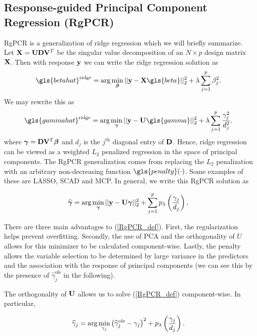 \documentclass[main.tex]{subfiles}
\begin{document}
%
%
%
%
%
%
%
%
%
%
%

\subsection{Response-guided Principal Component Regression (RgPCR)}
RgPCR is a generalization of ridge regression which we will briefly summarize. Let $\mathbf{X} = \mathbf{U} \mathbf{D} \mathbf{V}^T$ be the singular value decomposition of an $N \times p$ design matrix $\mathbf{X}$. Then with response $\mathbf{y}$ we can write the ridge regression solution as
\begin{align}
    \gls{betahat}^{\ridge} = \argmin_{\bbeta} ||\y - \X \gls{beta}||_2^2 + \lambda \sum_{j = 1}^p \beta_j^2.
\end{align}
We may rewrite this as
\begin{align}
    \gls{gammahat}^{\ridge} = \argmin_{\bgamma} ||\y - \U \gls{gamma}||^2_2 + \lambda \sum_{j = 1}^p \frac{\gamma_j^2}{d_j^2}. \label{RgPCR_ridge}
\end{align}
where $\boldsymbol \gamma = \mathbf{D} \mathbf{V}^T \boldsymbol \beta$ and $d_j$ is the $j^{\text{th}}$ diagonal entry of $\mathbf{D}$. Hence, ridge regression can be viewed as a weighted $L_2$ penalized regression in the space of principal components. The RgPCR generalization comes from replacing the $L_2$ penalization with an arbitrary non-decreasing function $\gls{penalty}(\cdot)$. Some examples of these are LASSO, SCAD and MCP. In general, we write this RgPCR solution as

\begin{align}
    \widehat{\boldsymbol \gamma} = \text{arg} \min_{\boldsymbol \gamma} ||\mathbf{y} - \mathbf{U} \boldsymbol \gamma||^2_2 + \sum_{j = 1}^p p_\lambda \left ( \frac{\gamma_j}{d_j} \right ), \label{RgPCR_def}
\end{align}

There are three main advantages to (\ref{RgPCR_def}). First, the regularization helps prevent overfitting. Secondly, the use of PCA and the orthogonality of $U$ allows for this minimizer to be calculated component-wise. Lastly, the penalty allows the variable selection to be determined by large variance in the predictors and the association with the response of principal components (we can see this by the presence of $\hat{\gamma}^{\text{ols}}_j$ in the following). 

The orthogonality of $\mathbf{U}$ allows us to solve (\ref{RgPCR_def}) component-wise. In particular,

\begin{align}
    \widehat{\gamma}_j = \text{arg} \min_{\gamma_j}  \left ( \widehat{\gamma}^{\text{ols}}_j - \gamma_j \right )^2 + p_\lambda \left ( \frac{\gamma_j}{d_j} \right ).  \label{RgPCR_def_j}
\end{align}
\end{document}
